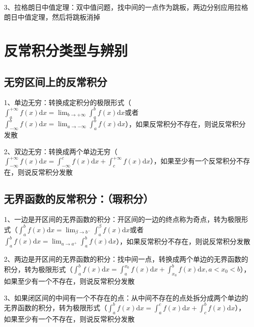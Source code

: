 3、拉格朗日中值定理：双中值问题，找中间的一点作为跳板，两边分别应用拉格朗日中值定理，然后将跳板消掉

\section{反常积分类型与辨别}



\subsection{无穷区间上的反常积分}

1、单边无穷：转换成定积分的极限形式（$ \int_{a}^{+\infty} f(x) \mathrm{d} x=\lim _{b \rightarrow+\infty} \int_{a}^{b} f(x) \mathrm{d} x $或者$ \int_{-\infty}^{b} f(x) \mathrm{d} x=\lim _{a \rightarrow-\infty} \int_{a}^{b} f(x) \mathrm{d} x $），如果反常积分不存在，则说反常积分发散

2、双边无穷：转换成两个单边无穷（$ \int_{-\infty}^{+\infty} f(x) \mathrm{d} x=\int_{-\infty}^{c} f(x) \mathrm{d} x+\int_{c}^{+\infty} f(x) \mathrm{d} x $），如果至少有一个反常积分不存在，则说反常积分发散



\subsection{无界函数的反常积分：（瑕积分）}

1、一边是开区间的无界函数的积分：开区间的一边的终点称为奇点，转为极限形式（$ \int_{a}^{b} f(x) \mathrm{d} x=\lim _{\beta \rightarrow b^{-}} \int_{a}^{\beta} f(x) \mathrm{d} x $或者$ \int_{a}^{b} f(x) \mathrm{d} x=\lim _{a \rightarrow a^{+}} \int_{a}^{b} f(x) \mathrm{d} x $），如果反常积分不存在，则说反常积分发散

2、两边是开区间的无界函数的积分：找中间一点，转换成两个单边的无界函数的积分，转为极限形式（$ \int_{a}^{b} f(x) \mathrm{d} x=\int_{a}^{x_{0}} f(x) \mathrm{d} x+\int_{x_{0}}^{b} f(x) \mathrm{d} x, a<x_{0}<b $），如果至少有一个不存在，则说反常积分发散

3、如果闭区间的中间有一个不存在的点：从中间不存在的点处拆分成两个单边的无界函数的积分，转为极限形式（$ \int_{a}^{b} f(x) \mathrm{d} x=\int_{a}^{c} f(x) \mathrm{d} x+\int_{c}^{b} f(x) \mathrm{d} x $），如果至少有一个不存在，则说反常积分发散



